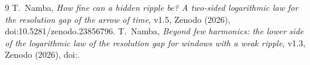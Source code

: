 \begin{thebibliography}{9}
 T.~Namba, \emph{How fine can a hidden ripple be? A two-sided logarithmic law for the resolution gap of the arrow of time}, v1.5, Zenodo (2026), doi:10.5281/zenodo.23856796.
 T.~Namba, \emph{Beyond few harmonics: the lower side of the logarithmic law of the resolution gap for windows with a weak ripple}, v1.3, Zenodo (2026), doi:\Hdoi.
\end{thebibliography}
